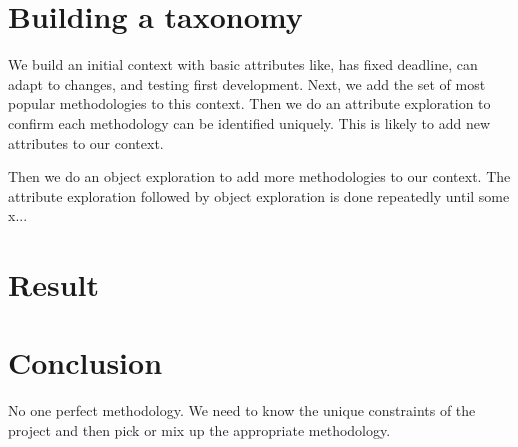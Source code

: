 \documentclass{article}
\begin{document}
\section{Building a taxonomy}
We build an initial context with basic attributes like, has fixed deadline, can adapt to changes, and testing first development.
Next, we add the set of most popular methodologies to this context.
Then we do an attribute exploration to confirm each methodology can be identified uniquely.
This is likely to add new attributes to our context.

Then we do an object exploration to add more methodologies to our context.
The attribute exploration followed by object exploration is done repeatedly until some x...
\section{Result}
\section{Conclusion}
No one perfect methodology.
We need to know the unique constraints of the project and then pick or mix up the appropriate methodology.
\end{document}

